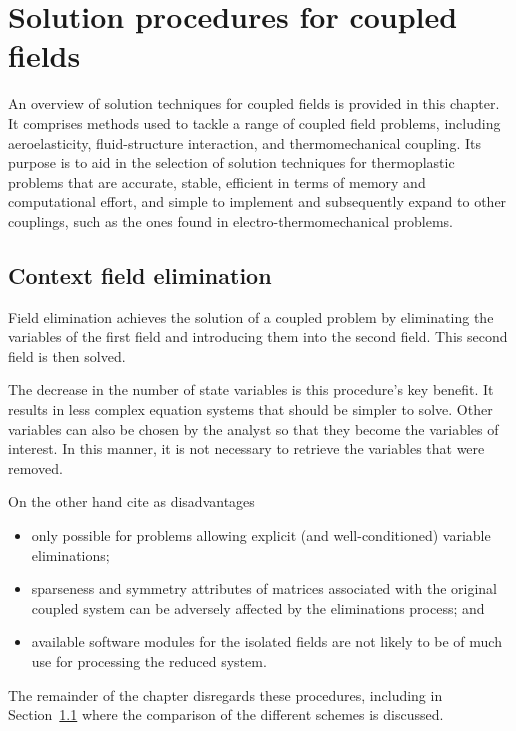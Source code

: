 
\chapter{Solution procedures for coupled fields} \label{ch:sol_proc_coupl_fields}

An overview of solution techniques for coupled fields is provided in this chapter.
It comprises methods used to tackle a range of coupled field problems, including aeroelasticity, fluid-structure interaction, and thermomechanical coupling.
Its purpose is to aid in the selection of solution techniques for thermoplastic problems that are accurate, stable, efficient in terms of memory and computational effort, and simple to implement and subsequently expand to other couplings, such as the ones found in electro-thermomechanical problems.

\section{Context field elimination}

Field elimination achieves the solution of a coupled problem by eliminating the variables of the first field and introducing them into the second field.
This second field is then solved.

The decrease in the number of state variables is this procedure's key benefit.
It results in less complex equation systems that should be simpler to solve.
Other variables can also be chosen by the analyst so that they become the variables of interest.
In this manner, it is not necessary to retrieve the variables that were removed. \citep{felippa_staggered_1980}

On the other hand \cite{felippa_staggered_1980} cite as disadvantages
\begin{itemize}
  \item only possible for problems allowing explicit (and well-conditioned) variable eliminations;
  \item sparseness and symmetry attributes of matrices associated with the original coupled system can be adversely affected by the eliminations process; and
  \item available software modules for the isolated fields are not likely to be of much use for processing the reduced system.
\end{itemize}
The remainder of the chapter disregards these procedures, including in Section~\ref{} where the comparison of the different schemes is discussed.

